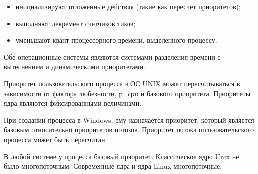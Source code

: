 \begin{itemize}
	\item инициализируют отложенные действия (такие как пересчет приоритетов);
	\item выполняют декремент счетчиков тиков;
	\item уменьшают квант процессорного времени, выделенного процессу.
\end{itemize}

Обе операционные системы являются системами разделения времени с вытеснением и динамическими приоритетами.

Приоритет пользовательского процесса в ОС UNIX может пересчитываться в зависимости от фактора любезности, p\_cpu и базового приоритета. Приоритеты ядра являются фиксированными величинами.

При создании процесса в Windows, ему назначается приоритет, который является базовым относительно приоритетов потоков. Приоритет потока пользовательского процесса может быть пересчитан.

В любой системе у процесса базовый приоритет. Классическое ядро Unix не было многопоточным. Современные ядра и ядра Linux многопоточные.
